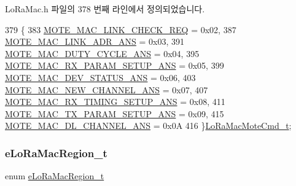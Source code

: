 Lo\+Ra\+Mac.\+h 파일의 378 번째 라인에서 정의되었습니다.


\begin{DoxyCode}
379 \{
383     \mbox{\hyperlink{group___l_o_r_a_m_a_c_ggaa56523d6cd76c438d6bc4263b5254d73a035270648ea6d6ff24b23a953d8f969b}{MOTE\_MAC\_LINK\_CHECK\_REQ}}          = 0x02,
387     \mbox{\hyperlink{group___l_o_r_a_m_a_c_ggaa56523d6cd76c438d6bc4263b5254d73a7e789c1aa1dfcd3ca03935dd65cf572c}{MOTE\_MAC\_LINK\_ADR\_ANS}}            = 0x03,
391     \mbox{\hyperlink{group___l_o_r_a_m_a_c_ggaa56523d6cd76c438d6bc4263b5254d73a258e400aeae362afff0d14b7f6153bd4}{MOTE\_MAC\_DUTY\_CYCLE\_ANS}}          = 0x04,
395     \mbox{\hyperlink{group___l_o_r_a_m_a_c_ggaa56523d6cd76c438d6bc4263b5254d73a155ae506492f1ddb173b99b52da4092a}{MOTE\_MAC\_RX\_PARAM\_SETUP\_ANS}}      = 0x05,
399     \mbox{\hyperlink{group___l_o_r_a_m_a_c_ggaa56523d6cd76c438d6bc4263b5254d73ae3d02a70f26e3f3daf8a84408e962425}{MOTE\_MAC\_DEV\_STATUS\_ANS}}          = 0x06,
403     \mbox{\hyperlink{group___l_o_r_a_m_a_c_ggaa56523d6cd76c438d6bc4263b5254d73a83cdaea222c3968f69fe1c23c29a4385}{MOTE\_MAC\_NEW\_CHANNEL\_ANS}}         = 0x07,
407     \mbox{\hyperlink{group___l_o_r_a_m_a_c_ggaa56523d6cd76c438d6bc4263b5254d73abd4c19102721cfb18b76136732ac2de8}{MOTE\_MAC\_RX\_TIMING\_SETUP\_ANS}}     = 0x08,
411     \mbox{\hyperlink{group___l_o_r_a_m_a_c_ggaa56523d6cd76c438d6bc4263b5254d73a462cebd0ba7165044eeabf44c00b1f4c}{MOTE\_MAC\_TX\_PARAM\_SETUP\_ANS}}      = 0x09,
415     \mbox{\hyperlink{group___l_o_r_a_m_a_c_ggaa56523d6cd76c438d6bc4263b5254d73a6dfc8ca9222ce73c834a0907992cce13}{MOTE\_MAC\_DL\_CHANNEL\_ANS}}          = 0x0A
416 \}\mbox{\hyperlink{group___l_o_r_a_m_a_c_ga7ef7dff520934ecc71835673f2acd015}{LoRaMacMoteCmd\_t}};
\end{DoxyCode}
\mbox{\label{group___l_o_r_a_m_a_c_ga5d863ec55bc300e0ffeef88bcbeb70af}} 
\subsubsection{\texorpdfstring{e\+Lo\+Ra\+Mac\+Region\+\_\+t}{eLoRaMacRegion\_t}}
{\footnotesize\ttfamily enum \mbox{\hyperlink{group___l_o_r_a_m_a_c_ga5d863ec55bc300e0ffeef88bcbeb70af}{e\+Lo\+Ra\+Mac\+Region\+\_\+t}}}

